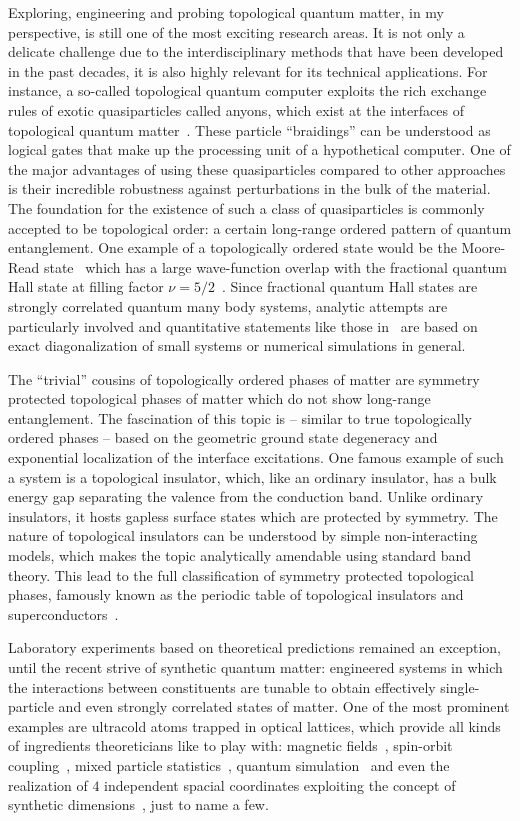 Exploring, engineering and probing topological quantum matter, in my perspective, is still one of the most exciting research areas.
It is not only a delicate challenge due to the interdisciplinary methods that have been developed in the past decades, it is also highly relevant for its technical applications.
For instance, a so-called topological quantum computer exploits the rich exchange rules of exotic quasiparticles called anyons, which exist at the interfaces of topological quantum matter~\cite{Freedman2002}.
These particle ``braidings'' can be understood as logical gates that make up the processing unit of a hypothetical computer.
One of the major advantages of using these quasiparticles compared to other approaches is their incredible robustness against perturbations in the bulk of the material.
The foundation for the existence of such a class of quasiparticles is commonly accepted to be topological order: a certain long-range ordered pattern of quantum entanglement.
One example of a topologically ordered state would be the Moore-Read state~\cite{Moore1991,Read1996} which has a large wave-function overlap with the fractional quantum Hall state at filling factor $\nu=5/2$~\cite{Storni2010}.
Since fractional quantum Hall states are strongly correlated quantum many body systems, analytic attempts are particularly involved and quantitative statements like those in~\cite{Storni2010} are based on exact diagonalization of small systems or numerical simulations in general.

The ``trivial'' cousins of topologically ordered phases of matter are symmetry protected topological phases of matter which do not show long-range entanglement.
The fascination of this topic is -- similar to true topologically ordered phases -- based on the geometric ground state degeneracy and exponential localization of the interface excitations.
One famous example of such a system is a topological insulator, which, like an ordinary insulator, has a bulk energy gap separating the valence from the conduction band.
Unlike ordinary insulators, it hosts gapless surface states which are protected by symmetry.
The nature of topological insulators can be understood by simple non-interacting models, which makes the topic analytically amendable using standard band theory.
This lead to the full classification of symmetry protected topological phases, famously known as the periodic table of topological insulators and superconductors~\cite{Altland1997,Kitaev2009}.

Laboratory experiments based on theoretical predictions remained an exception, until the recent strive of synthetic quantum matter:
engineered systems in which the interactions between constituents are tunable to obtain effectively single-particle and even strongly correlated states of matter.
One of the most prominent examples are ultracold atoms trapped in optical lattices, which provide all kinds of ingredients theoreticians like to play with: magnetic fields~\cite{Lin2009}, spin-orbit coupling~\cite{Lin2011}, mixed particle statistics~\cite{Ferrari2002}, quantum simulation~\cite{Mazza2012} and even the realization of $4$ independent spacial coordinates exploiting the concept of synthetic dimensions~\cite{Lohse2018}, just to name a few.
%
%
